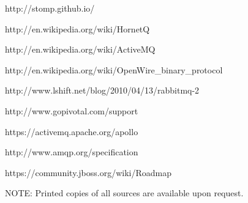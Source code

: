 \documentclass{thesis}
\begin{document}
\begin{singlespace}
\begin{thebibliography}{99}
 http://stomp.github.io/

 http://en.wikipedia.org/wiki/HornetQ

 http://en.wikipedia.org/wiki/ActiveMQ

 http://en.wikipedia.org/wiki/OpenWire\_binary\_protocol

 http://www.lshift.net/blog/2010/04/13/rabbitmq-2

 http://www.gopivotal.com/support 

 https://activemq.apache.org/apollo

 http://www.amqp.org/specification

 https://community.jboss.org/wiki/Roadmap




NOTE: Printed copies of all sources are available upon request. 

\end{thebibliography}
\end{singlespace}


\appendix    %
\end{document}
